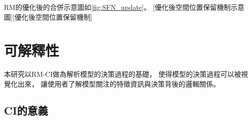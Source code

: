 \documentclass[class=NCU_thesis, crop=false]{standalone}
\begin{document}
	
	
	RM的優化後的合併示意圖如\cref{fig:SFN_update}。
	[優化後空間位置保留機制示意圖][優化後空間位置保留機制]


\pagebreak
\section{可解釋性} 
本研究以RM-CI做為解析模型的決策過程的基礎，
使得模型的決策過程可以被視覺化出來，
讓使用者了解模型關注的特徵資訊與決策背後的邏輯關係。

	\subsection{CI的意義}
	\label{section:InterablePicture}


\end{document}
